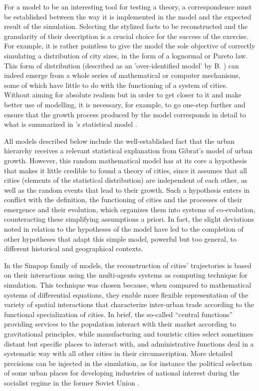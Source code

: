 \documentclass[10pt]{article}
\begin{document}
For a model to be an interesting tool for testing a theory, a correspondence must be established between the way it is implemented in the model and the expected result of the simulation. Selecting the stylized facts to be reconstructed and the granularity of their description is a crucial choice for the success of the exercise. For example, it is rather pointless to give the model the sole objective of correctly simulating a distribution of city sizes, in the form of a lognormal or Pareto law. This form of distribution (described as an 'over-identified model' by B. \cite{robson1973urban}) can indeed emerge from a whole series of mathematical or computer mechanisms, some of which have little to do with the functioning of a system of cities. Without aiming for absolute realism but in order to get closer to it and make better use of modelling, it is necessary, for example, to go one-step further and ensure that the growth process produced by the model corresponds in detail to what is summarized in \cite{gibrat1931inegalites}'s statistical model \citep{modica2017methodological}.


All models described below include the well-established fact that the urban hierarchy receives a relevant statistical explanation from Gibrat's model of urban growth. However, this random mathematical model has at its core a hypothesis that makes it little credible to found a theory of cities, since it assumes that all cities (elements of the statistical distribution) are independent of each other, as well as the random events that lead to their growth. Such a hypothesis enters in conflict with the definition, the functioning of cities and the processes of their emergence and their evolution, which organizes them into systems of co-evolution, counteracting these simplifying assumptions a priori. In fact, the slight deviations noted in relation to the hypotheses of the model have led to the completion of other hypotheses that adapt this simple model, powerful but too general, to different historical and geographical contexts.

In the Simpop family of models, the reconstruction of cities' trajectories is based on their interactions using the multi-agents systems as computing technique for simulation. This technique was chosen because, when compared to mathematical systems of differential equations, they enable more flexible representation of the variety of spatial interactions that characterize inter-urban trade according to the functional specialization of cities. In brief, the so-called ``central functions'' providing services to the population interact with their market according to gravitational principles, while manufacturing and touristic cities select sometimes distant but specific places to interact with, and administrative functions deal in a systematic way with all other cities in their circumscription. More detailed precisions can be injected in the simulation, as for instance the political selection of some urban places for developing industries of national interest during the socialist regime in the former Soviet Union \citep{cottineau2014evolution}.
\end{document}
